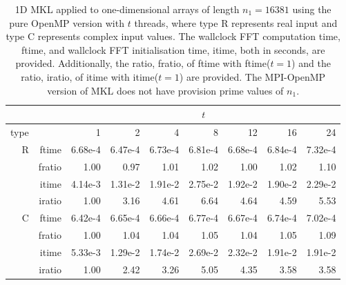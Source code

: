 \documentclass[a4]{article}
\begin{document}
\begin{table}
\begin{center}
\begin{tabular}{|r|r|r|r|r|r|r|r|r|}
\hline 
     &  & \multicolumn{7}{c|}{$t$} \\ \hline
    type  &  & 1           & 2    & 4    & 8    & 12   & 16    & 24  \\ \hline\hline
    R  & ftime &  6.68e-4 &   6.47e-4 &   6.73e-4 &   6.81e-4 &   6.68e-4 &   6.84e-4 &   7.32e-4    \\ 
      & fratio &  1.00 &   0.97 &   1.01 &   1.02 &   1.00 &   1.02 &   1.10    \\ 
     & itime &   4.14e-3 &   1.31e-2 &   1.91e-2 &   2.75e-2 &   1.92e-2 &   1.90e-2 &   2.29e-2      \\ 
     & iratio &   1.00 &   3.16 &   4.61 &   6.64 &   4.64 &   4.59 &   5.53    \\ \hline
   C & ftime &    6.42e-4 &   6.65e-4 &   6.66e-4 &   6.77e-4 &   6.67e-4 &   6.74e-4 &   7.02e-4    \\
     & fratio &  1.00 &   1.04 &   1.04 &   1.05 &   1.04 &   1.05 &   1.09   \\
     & itime &   5.33e-3 &   1.29e-2 &   1.74e-2 &   2.69e-2 &   2.32e-2 &   1.91e-2 &   1.91e-2   \\
     & iratio &  1.00 &   2.42 &   3.26 &   5.05 &   4.35 &   3.58 &   3.58    \\ \hline
\end{tabular}
\caption{1D MKL applied to one-dimensional arrays of length $n_1=16381$ using the pure OpenMP version with $t$ threads, where type R represents real input and type C represents complex input values. The wallclock FFT computation time, ftime, and wallclock FFT initialisation time, itime, both in seconds, are provided. Additionally, the ratio, fratio, of ftime  with ftime($t=1$) and the ratio, iratio, of itime  with itime($t=1$) are provided. The MPI-OpenMP version of MKL does not have provision prime values of $n_1.$  }\label{Tbl:MKL1d16381}
\end{center}
\end{table}
\end{document}
